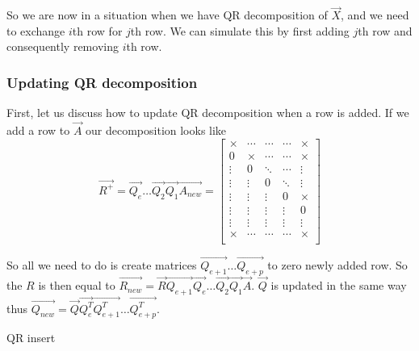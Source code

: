 So we are now in a situation when we have QR decomposition of $\vec{X}$, and we need to exchange $i$th row for $j$th row. We can simulate this by first adding $j$th row and consequently removing $i$th row.



\subsubsection*{Updating QR decomposition}
First, let us discuss how to update QR decomposition when a row is added. 
If we add a row to $\vec{A}$ our decomposition looks like
\begin{equation}
    \vec{R^{+}} = \vec{Q_e}\ldots\vec{Q_2}\vec{Q_1}\vec{A_{new}}  = 
    \begin{bmatrix}
        \times & \cdots & \cdots & \cdots & \times \\
        0 &\times & \cdots & \cdots & \times \\
        \vdots& 0&\ddots & \cdots & \vdots \\
        \vdots& \vdots&0 & \ddots &  \vdots \\
        \vdots& \vdots& \vdots& 0& \times \\
        \vdots& \vdots& \vdots& \vdots& 0  \\
        \vdots& \vdots& \vdots& \vdots& \vdots \\
        \times & \cdots & \cdots & \cdots & \times \\
    \end{bmatrix}
\end{equation}

So all we need to do is create matrices $\vec{Q_{e+1}}\ldots\vec{Q_{e+p}}$ to zero newly added row.
So the $R$ is then equal to $\vec{R_{new}} = \vec{R}\vec{Q_{e+1}}\vec{Q_e}\ldots\vec{Q_2}\vec{Q_1}\vec{A}$. 
$\vec{Q}$ is updated in the same way thus $\vec{Q_{new}} = \vec{Q}\vec{Q_e^T}\vec{Q_{e+1}^T}\ldots\vec{Q_{e+p}^T}$.

\begin{algorithm}[H]
    \label{addingrowqr}
      \caption{QR insert}

    \;
\end{algorithm}

